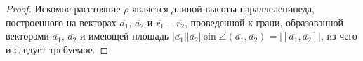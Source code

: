 \begin{proof}
	Искомое расстояние $\rho$ является длиной высоты параллелепипеда, построенного на векторах $\overline{a_1}$, $\overline{a_2}$ и $\overline{r_1} - \overline{r_2}$, проведенной к грани, образованной векторами $\overline{a_1}$, $\overline{a_2}$ и имеющей площадь $|\overline{a_1}||\overline{a_2}|\sin\angle(\overline{a_1}, \overline{a_2}) = |[\overline{a_1}, \overline{a_2}]|$, из чего и следует требуемое.
\end{proof}
